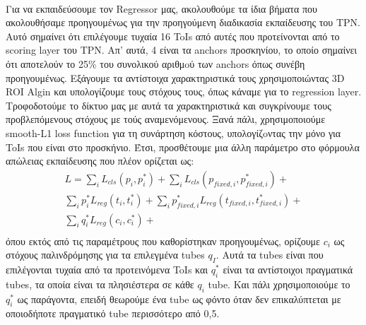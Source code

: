 \paragraph{}
Για να εκπαιδεύσουμε τον \en Regressor \gr μας, ακολουθούμε τα ίδια βήματα που ακολουθήσαμε προηγουμένως για την προηγούμενη διαδικασία εκπαίδευσης του \en TPN\gr. Αυτό σημαίνει ότι 
επιλέγουμε τυχαία 16  \en ToIs \gr από αυτές που προτείνονται από το \en scoring layer \gr του \en TPN\gr. Απ' αυτά, 4 είναι τα \en anchors \gr προσκηνίου, το οποίο σημαίνει ότι αποτελούν το 25\%
του συνολικού αριθμoύ των \en anchors \gr όπως συνέβη προηγουμένως. Εξάγουμε τα αντίστοιχα χαρακτηριστικά τους χρησιμοποιώντας \en 3D ROI Algin \gr και υπολογίζουμε τους στόχους τους, όπως
κάναμε για το \en regression layer\gr. Τροφοδοτούμε το δίκτυο μας με αυτά τα χαρακτηριστικά και συγκρίνουμε τους προβλεπόμενους στόχους με τούς αναμενόμενους.
Ξανά πάλι, χρησιμοποιούμε \en smooth-L1 loss function \gr για τη συνάρτηση κόστους, υπολογίζoντας την μόνο για \en ToIs \gr που είναι στο προσκήνιο. Έτσι, προσθέτουμε μια άλλη παράμετρο στο
φόρμουλα απώλειας εκπαίδευσης που πλέον ορίζεται ως:
\en
\begin{equation} 
\begin{split}
 L  =  \sum_iL_{cls}(p_i, p_i^*) + \sum_iL_{cls}(p_{fixed,i}, p_{fixed,i}^*) + \\
 \sum_ip_i^*L_{reg}(t_i,t_i^*) + \sum_ip_{fixed,i}^*L_{reg}(t_{fixed,i},t_{fixed,i}^*) + \\
  \sum_iq_i^*L_{reg}(c_{i}, c_{i}^*) + \\
\end{split}
\end{equation}
\gr όπου εκτός από τις παραμέτρους που καθορίστηκαν προηγουμένως, ορίζουμε $c_{i} $ ως στόχους παλινδρόμησης για τα επιλεγμένα \en tubes \gr $q _I $.
Αυτά τα \en tubes \gr είναι που επιλέγονται τυχαία από τα προτεινόμενα \en ToIs \gr και  $q_i^*$ είναι τα αντίστοιχοι πραγματικά \en tubes\gr, τα οποία είναι τα  πλησιέστερα σε κάθε $q_i$ \en tube\gr.
Και πάλι χρησιμοποιούμε το $q_i^*$ ως παράγοντα, επειδή θεωρούμε ένα \en tube \gr ως φόντο όταν δεν επικαλύπτεται με οποιοδήποτε πραγματικό \en tube \gr περισσότερο από 0,5.

